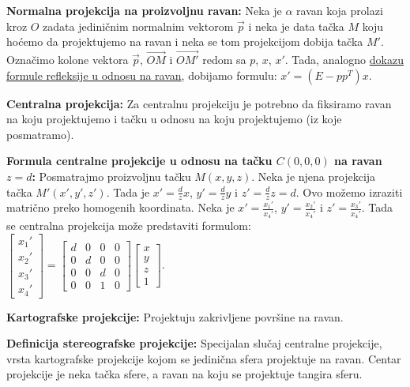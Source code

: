 \documentclass[12pt]{article}
\newcommand{\vek}[1]{\overrightarrow{#1}}
\begin{document}
\textbf{Normalna projekcija na proizvoljnu ravan:} Neka je $\alpha$ ravan koja
prolazi kroz $O$ zadata jediničnim normalnim vektorom $\vek{p}$ i neka je data
tačka $M$ koju hoćemo da projektujemo na ravan i neka se tom projekcijom dobija
tačka $M'$. Označimo kolone vektora $\vek{p}$, $\vek{OM}$ i $\vek{OM'}$ redom
sa $p$, $x$, $x'$. Tada, analogno \hyperref[refleksija_u_odnosu_na_ravan]
{dokazu formule refleksije u odnosu na ravan},
dobijamo formulu: $x'=(E-pp^T)x$.
\par

\textbf{Centralna projekcija:} Za centralnu projekciju je potrebno da fiksiramo
ravan na koju projektujemo i tačku u odnosu na koju projektujemo (iz koje
posmatramo).
\par

\textbf{Formula centralne projekcije u odnosu na tačku $C(0,0,0)$ na ravan
    $z=d$:} Posmatrajmo proizvoljnu tačku $M(x,y,z)$. Neka je njena projekcija
tačka $M'(x',y',z')$. Tada je $x'=\frac{d}{z}x$, $y'=\frac{d}{z}y$
i $z'=\frac{d}{z}z=d$. Ovo možemo izraziti matrično preko homogenih
koordinata. Neka je $x'=\frac{x_1'}{x_4'}$, $y'=\frac{x_2'}{x_4'}$ i
$z'=\frac{x_3'}{x_4'}$. Tada se centralna projekcija može predstaviti formulom:
$\begin{bmatrix}
        x_1' \\
        x_2' \\
        x_3' \\
        x_4'
    \end{bmatrix}=\begin{bmatrix}
        d & 0 & 0 & 0 \\
        0 & d & 0 & 0 \\
        0 & 0 & d & 0 \\
        0 & 0 & 1 & 0
    \end{bmatrix}\begin{bmatrix}
        x \\
        y \\
        z \\
        1
    \end{bmatrix}$.
\par

\textbf{Kartografske projekcije:} Projektuju zakrivljene površine na ravan.
\par

\textbf{Definicija stereografske projekcije:} Specijalan slučaj centralne projekcije,
vrsta kartografske projekcije kojom se jedinična sfera projektuje na ravan.
Centar projekcije je neka tačka sfere, a ravan na koju se projektuje tangira
sferu.
\par
\end{document}
